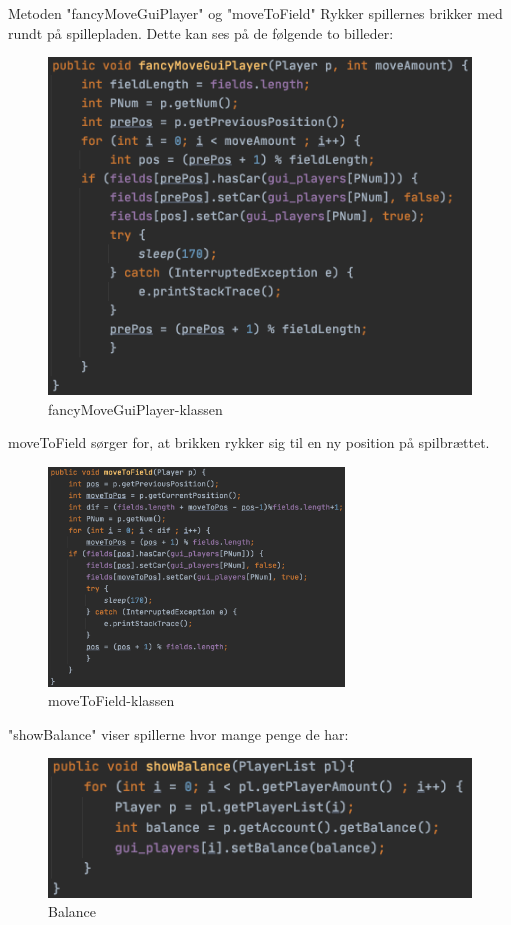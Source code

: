 Metoden "fancyMoveGuiPlayer" og "moveToField" Rykker spillernes brikker med rundt på spillepladen. Dette kan ses på de følgende to billeder: 
\begin{figure}[H]
    \centering
    \includegraphics{sources/7_implementering/GameGUIfancyMove.png}
    \caption{fancyMoveGuiPlayer-klassen}
    \label{fig:GUIklasse}
\end{figure}
moveToField sørger for, at brikken rykker sig til en ny position på spilbrættet.
\begin{figure}[H]
    \centering
    \includegraphics[width=0.7\textwidth]{sources/7_implementering/GameGUImoveToField.png}
    \caption{moveToField-klassen}
    \label{fig:GUImoveToField}
\end{figure}
"showBalance" viser spillerne hvor mange penge de har:
\begin{figure}[H]
    \centering
    \includegraphics{sources/7_implementering/GameGUIshowBalance.png}
    \caption{Balance}
    \label{fig:GUIbalance}
\end{figure}
